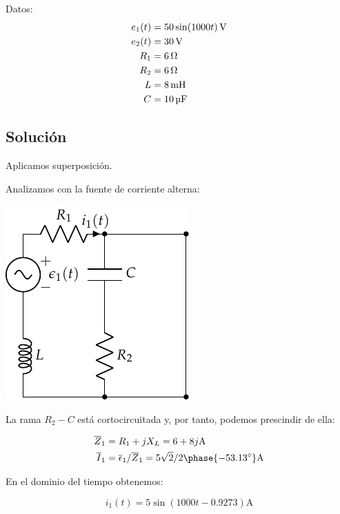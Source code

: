 \documentclass[12pt]{article}
\begin{document}
Datos:
\begin{align*}
  e_1(t) &= \SI[parse-numbers=false]{50 \sin(1000 t)}{\volt}\\
  e_2(t) &= \SI{30}{\volt}\\
  R_1 &= \SI{6}{\ohm}\\
  R_2 &= \SI{6}{\ohm}\\
  L &= \SI{8}{\milli\henry}\\
  C &= \SI{10}{\micro\farad}
\end{align*}


\noindent\hrulefill

\subsection*{Solución}

Aplicamos superposición.

Analizamos con la fuente de corriente alterna:

\begin{center}
\includegraphics{figs/superposicion1_AC}
\end{center}

La rama $R_2 - C$ está cortocircuitada y, por tanto, podemos prescindir de ella:

\begin{align*}
  \overline{Z}_1 &= R_1 + jX_L = 6 + 8j\si{\ampere}\\
  \overline{I}_1 &= \overline{\epsilon}_1 / \overline{Z}_1 = 5\sqrt{2}/2\phase{\ang{-53.13}}\si{\ampere}
\end{align*}

En el dominio del tiempo obtenemos:

\begin{equation*}
  i_1(t) = 5\sin(1000t - 0.9273)\si{\ampere}
\end{equation*}
\end{document}
